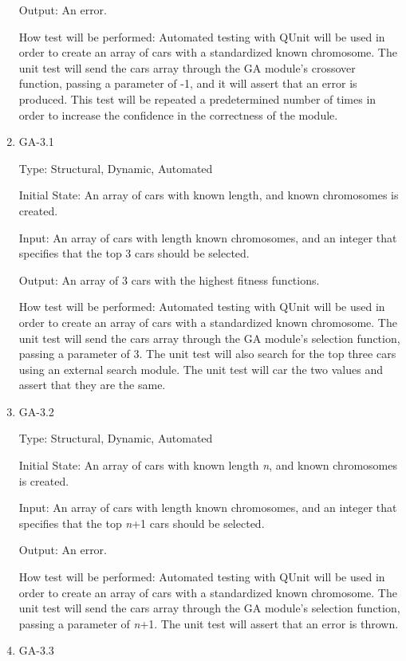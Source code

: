 \documentclass[12pt, titlepage]{article}
\begin{document}
\begin{enumerate}
Output: An error.
					
How test will be performed: Automated testing with QUnit will be used in order to create an array of cars with a standardized known chromosome. The unit test will send the cars array through the GA module's crossover function, passing a parameter of -1, and it will assert that an error is produced. This test will be repeated  a predetermined number of times in order to increase the confidence in the correctness of the module.

\item{GA-3.1\\}

Type: Structural, Dynamic, Automated
					
Initial State: An array of cars with known length, and known chromosomes is created.
					
Input: An array of cars with length known chromosomes, and an integer that specifies that the top 3 cars should be selected.
					
Output: An array of 3 cars with the highest fitness functions.
					
How test will be performed: Automated testing with QUnit will be used in order to create an array of cars with a standardized known chromosome. The unit test will send the cars array through the GA module's selection function, passing a parameter of 3. The unit test will also search for the top three cars using an external search module. The unit test will car the two values and assert that they are the same.


\item{GA-3.2\\}

Type: Structural, Dynamic, Automated
					
Initial State: An array of cars with known length \textit{n}, and known chromosomes is created.
					
Input: An array of cars with length known chromosomes, and an integer that specifies that the top  \textit{n}+1 cars should be selected.
					
Output: An error.
					
How test will be performed: Automated testing with QUnit will be used in order to create an array of cars with a standardized known chromosome. The unit test will send the cars array through the GA module's selection function, passing a parameter of \textit{n}+1. The unit test will assert that an error is thrown.


\item{GA-3.3\\}


\end{enumerate}
\end{document}
